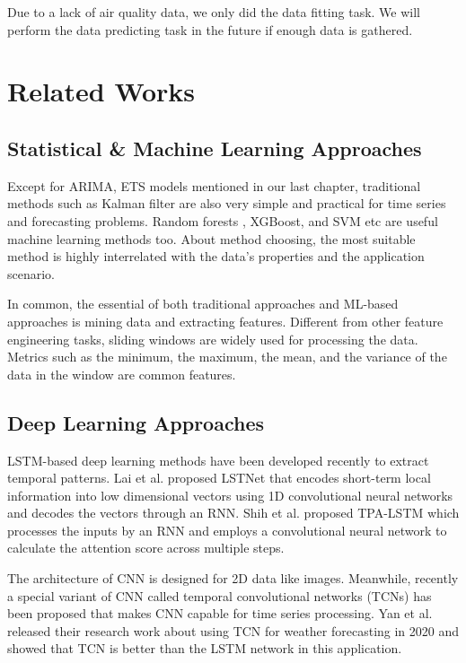 \documentclass[sigconf]{acmart}
\begin{document}
Due to a lack of air quality data, we only did the data fitting task. We will perform the data predicting task in the future if enough data is gathered.

\section{Related Works}
\subsection{Statistical \& Machine Learning Approaches}

Except for ARIMA, ETS models mentioned in our last chapter, traditional methods such as Kalman filter \cite{gomez1994estimation} are also very simple and practical for time series and forecasting problems. Random forests \cite{rouet2017machine}, XGBoost, and SVM \cite{sapankevych2009time} etc are useful machine learning methods too. About method choosing, the most suitable method is highly interrelated with the data's properties and the application scenario. 

In common, the essential of both traditional approaches and ML-based approaches is mining data and extracting features. Different from other feature engineering tasks, sliding windows are widely used for processing the data. Metrics such as the minimum, the maximum, the mean, and the variance of the data in the window are common features.

\subsection{Deep Learning Approaches}

LSTM-based deep learning methods have been developed recently to extract temporal patterns. Lai et al. proposed LSTNet \cite{lai2018modeling} that encodes short-term local information into low dimensional vectors using 1D convolutional neural networks and decodes the vectors through an RNN. Shih et al. proposed TPA-LSTM \cite{shih2019temporal}  which processes the inputs by an RNN and employs a convolutional neural network to calculate the attention score across multiple steps.

The architecture of CNN is designed for 2D data like images. Meanwhile, recently a special variant of CNN called temporal convolutional networks (TCNs) \cite{lea2016temporal} has been proposed that makes CNN capable for time series processing. Yan et al. \cite{yan2020temporal} released their research work about using TCN for weather forecasting in 2020 and showed that TCN is better than the LSTM network in this application.
\end{document}

